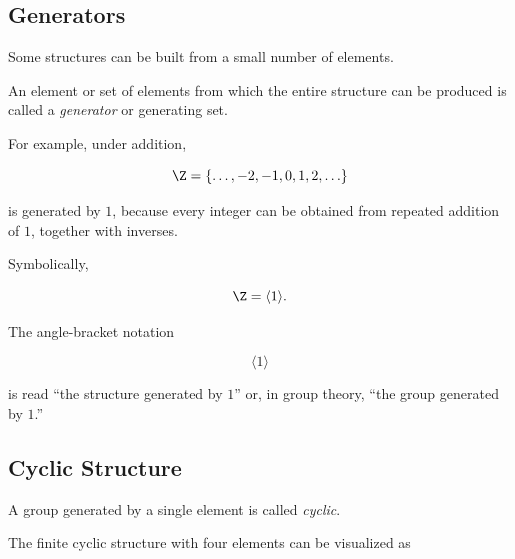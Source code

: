 \subsection{Generators}
\label{subsec:generators}

Some structures can be built from a small number of elements.

An element or set of elements from which the entire structure can be produced
is called a \emph{generator} or generating set.

For example, under addition,

\[ \Z=\{\ldots,-2,-1,0,1,2,\ldots\} \]

is generated by \(1\), because every integer can be obtained from repeated
addition of \(1\), together with inverses.

Symbolically,

\[ \Z=\langle 1\rangle. \]

The angle-bracket notation

\[ \langle 1\rangle \]

is read ``the structure generated by \(1\)'' or, in group theory, ``the group
generated by \(1\).''

\subsection{Cyclic Structure}
\label{subsec:cyclic-structure}

A group generated by a single element is called \emph{cyclic}.

The finite cyclic structure with four elements can be visualized as

\begin{center}
\end{center}

